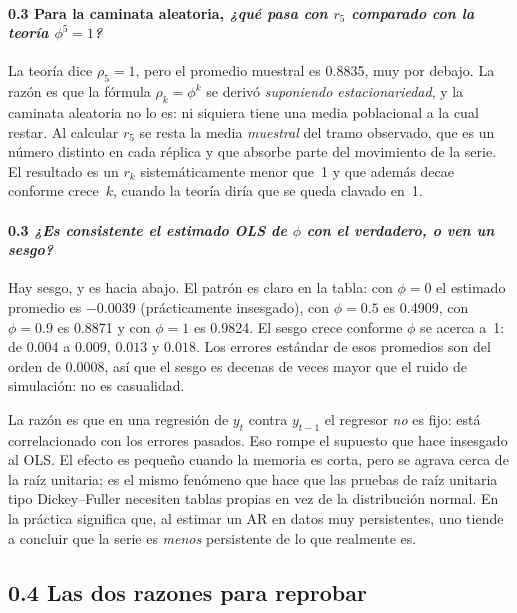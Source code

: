 \documentclass[11pt]{article}
\begin{document}
\paragraph{0.3 Para la caminata aleatoria, {\normalfont\itshape ¿qu\'e pasa
con $r_5$ comparado con la teor\'ia $\phi^5 = 1$?}} La teor\'ia dice
$\rho_5 = 1$, pero el promedio muestral es \num{0.8835}, muy por debajo. La
raz\'on es que la f\'ormula $\rho_k = \phi^k$ se deriv\'o \emph{suponiendo
estacionariedad}, y la caminata aleatoria no lo es: ni siquiera tiene una
media poblacional a la cual restar. Al calcular $r_5$ se resta la media
\emph{muestral} del tramo observado, que es un n\'umero distinto en cada
r\'eplica y que absorbe parte del movimiento de la serie. El resultado es un
$r_k$ sistem\'aticamente menor que~1 y que adem\'as decae conforme crece~$k$,
cuando la teor\'ia dir\'ia que se queda clavado en~1.

\paragraph{0.3 {\normalfont\itshape ¿Es consistente el estimado OLS de
$\phi$ con el verdadero, o ven un sesgo?}} Hay sesgo, y es hacia abajo. El
patr\'on es claro en la tabla: con $\phi=0$ el estimado promedio es
\num{-0.0039} (pr\'acticamente insesgado), con $\phi=0.5$ es \num{0.4909},
con $\phi=0.9$ es \num{0.8871} y con $\phi=1$ es \num{0.9824}. El sesgo
crece conforme $\phi$ se acerca a~1: de $\num{0.004}$ a $\num{0.009}$,
$\num{0.013}$ y $\num{0.018}$. Los errores est\'andar de esos promedios son
del orden de \num{0.0008}, as\'i que el sesgo es decenas de veces mayor que
el ruido de simulaci\'on: no es casualidad.

La raz\'on es que en una regresi\'on de $y_t$ contra $y_{t-1}$ el regresor
\emph{no} es fijo: est\'a correlacionado con los errores pasados. Eso rompe
el supuesto que hace insesgado al OLS. El efecto es peque\~no cuando la
memoria es corta, pero se agrava cerca de la ra\'iz unitaria; es el mismo
fen\'omeno que hace que las pruebas de ra\'iz unitaria tipo Dickey--Fuller
necesiten tablas propias en vez de la distribuci\'on normal. En la
pr\'actica significa que, al estimar un AR en datos muy persistentes, uno
tiende a concluir que la serie es \emph{menos} persistente de lo que
realmente es.

\subsection{0.4 Las dos razones para reprobar}
\end{document}
